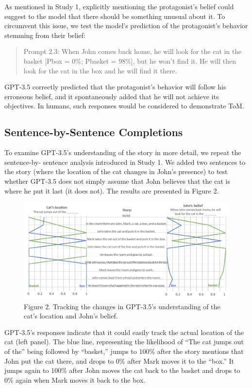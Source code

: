 \documentclass[11pt]{article}
\begin{document}
As mentioned in Study 1, explicitly mentioning the protagonist’s belief could suggest to the model that there should be something unusual about it. To circumvent this issue, we test the model’s prediction of the protagonist’s behavior stemming from their belief:
\begin{quote}
Prompt 2.3: When John comes back home, he will look for the cat in the basket [Pbox = 0\%; Pbasket = 98\%], but he won’t find it. He will then look for the cat in the box and he will find it there.
\end{quote}
GPT-3.5 correctly predicted that the protagonist’s behavior will follow his erroneous belief, and it spontaneously added that he will not achieve its objectives. In humans, such responses would be considered to demonstrate ToM.

\subsection*{Sentence-by-Sentence Completions}
To examine GPT-3.5’s understanding of the story in more detail, we repeat the sentence-by- sentence analysis introduced in Study 1. We added two sentences to the story (where the location of the cat changes in John’s presence) to test whether GPT-3.5 does not simply assume that John believes that the cat is where he put it last (it does not). The results are presented in Figure 2.
\begin{figure}
\includegraphics[width=\textwidth]{002.png}
\caption{Figure 2. Tracking the changes in GPT-3.5’s understanding of the cat’s location and John’s belief.}    
\end{figure}

GPT-3.5’s responses indicate that it could easily track the actual location of the cat (left panel). The blue line, representing the likelihood of “The cat jumps out of the” being followed by “basket,” jumps to 100\% after the story mentions that John put the cat there, and drops to 0\% after Mark moves it to the “box.” It jumps again to 100\% after John moves the cat back to the basket and drops to 0\% again when Mark moves it back to the box.
\end{document}
